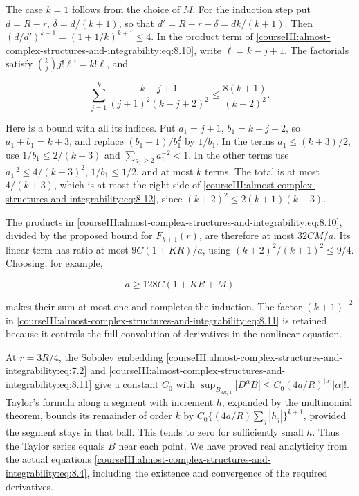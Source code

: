 The case \(k=1\) follows from the choice of \(M\). For the induction step put \(d=R-r\), \(\delta=d/(k+1)\), so that \(d'=R-r-\delta=dk/(k+1)\). Then
\((d/d')^{k+1}=(1+1/k)^{k+1}\leq4\).
In the product term of \eqref{courseIII:almost-complex-structures-and-integrability:eq:8.10}, write \(\ell=k-j+1\). The factorials satisfy \(\binom kj j!\ell!=k!\ell\), and

\begin{equation}
\sum_{j=1}^k\frac{k-j+1}{(j+1)^2(k-j+2)^2}
\leq \frac{8(k+1)}{(k+2)^2}.
\label{courseIII:almost-complex-structures-and-integrability:eq:8.12}
\end{equation}

Here is a bound with all its indices. Put \(a_1=j+1\), \(b_1=k-j+2\), so \(a_1+b_1=k+3\), and replace \((b_1-1)/b_1^2\) by \(1/b_1\). In the terms \(a_1\leq(k+3)/2\), use \(1/b_1\leq2/(k+3)\) and \(\sum_{a_1\geq2}a_1^{-2}<1\). In the other terms use \(a_1^{-2}\leq4/(k+3)^2\), \(1/b_1\leq1/2\), and at most \(k\) terms. The total is at most \(4/(k+3)\), which is at most the right side of \eqref{courseIII:almost-complex-structures-and-integrability:eq:8.12}, since \((k+2)^2\leq2(k+1)(k+3)\).

The products in \eqref{courseIII:almost-complex-structures-and-integrability:eq:8.10}, divided by the proposed bound for \(F_{k+1}(r)\), are therefore at most \(32CM/a\). Its linear term has ratio at most \(9C(1+KR)/a\), using \((k+2)^2/(k+1)^2\leq9/4\). Choosing, for example,

\begin{equation}
a\geq128C(1+KR+M)
\label{courseIII:almost-complex-structures-and-integrability:eq:8.13}
\end{equation}

makes their sum at most one and completes the induction. The factor \((k+1)^{-2}\) in \eqref{courseIII:almost-complex-structures-and-integrability:eq:8.11} is retained because it controls the full convolution of derivatives in the nonlinear equation.

At \(r=3R/4\), the Sobolev embedding \eqref{courseIII:almost-complex-structures-and-integrability:eq:7.2} and \eqref{courseIII:almost-complex-structures-and-integrability:eq:8.11} give a constant \(C_0\) with
\(\sup_{B_{3R/4}}|D^\alpha B|\leq C_0(4a/R)^{|\alpha|}|\alpha|!\).
Taylor's formula along a segment with increment \(h\), expanded by the multinomial theorem, bounds its remainder of order \(k\) by
\(C_0\{(4a/R)\sum_j|h_j|\}^{k+1}\), provided the segment stays in that ball. This tends to zero for sufficiently small \(h\). Thus the Taylor series equals \(B\) near each point. We have proved real analyticity from the actual equations \eqref{courseIII:almost-complex-structures-and-integrability:eq:8.4}, including the existence and convergence of the required derivatives.

